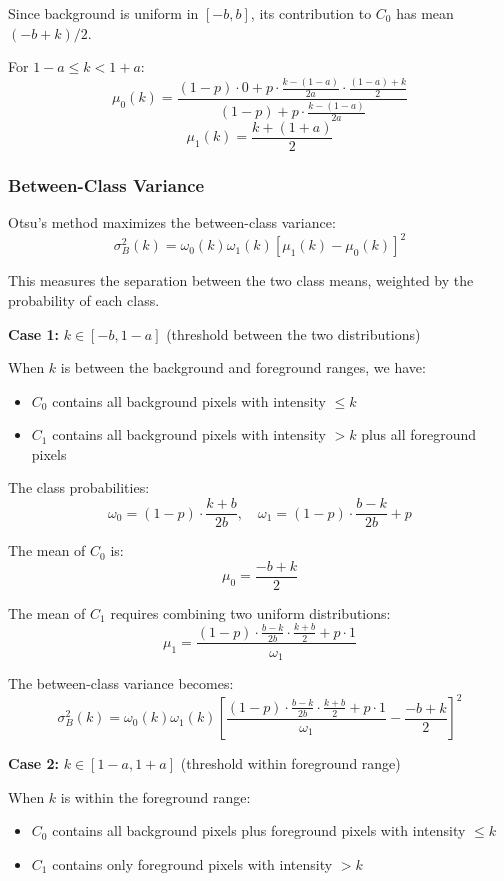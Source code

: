 \documentclass[11pt,a4paper]{article}
\begin{document}
Since background is uniform in $[-b, b]$, its contribution to $C_0$ has mean $(-b + k)/2$.

For $1-a \leq k < 1+a$:
$$\mu_0(k) = \frac{(1-p) \cdot 0 + p \cdot \frac{k-(1-a)}{2a} \cdot \frac{(1-a)+k}{2}}{(1-p) + p \cdot \frac{k-(1-a)}{2a}}$$
$$\mu_1(k) = \frac{k + (1+a)}{2}$$

\subsubsection{Between-Class Variance}
Otsu's method maximizes the between-class variance:
$$\sigma_B^2(k) = \omega_0(k) \omega_1(k) [\mu_1(k) - \mu_0(k)]^2$$

This measures the separation between the two class means, weighted by the probability of each class.

\textbf{Case 1: } $k \in [-b, 1-a]$ (threshold between the two distributions)

When $k$ is between the background and foreground ranges, we have:
\begin{itemize}
    \item $C_0$ contains all background pixels with intensity $\leq k$
    \item $C_1$ contains all background pixels with intensity $> k$ plus all foreground pixels
\end{itemize}

The class probabilities:
$$\omega_0 = (1-p) \cdot \frac{k+b}{2b}, \quad \omega_1 = (1-p) \cdot \frac{b-k}{2b} + p$$

The mean of $C_0$ is:
$$\mu_0 = \frac{-b + k}{2}$$

The mean of $C_1$ requires combining two uniform distributions:
$$\mu_1 = \frac{(1-p) \cdot \frac{b-k}{2b} \cdot \frac{k+b}{2} + p \cdot 1}{\omega_1}$$

The between-class variance becomes:
$$\sigma_B^2(k) = \omega_0(k) \omega_1(k) \left[\frac{(1-p) \cdot \frac{b-k}{2b} \cdot \frac{k+b}{2} + p \cdot 1}{\omega_1} - \frac{-b+k}{2}\right]^2$$

\textbf{Case 2: } $k \in [1-a, 1+a]$ (threshold within foreground range)

When $k$ is within the foreground range:
\begin{itemize}
    \item $C_0$ contains all background pixels plus foreground pixels with intensity $\leq k$
    \item $C_1$ contains only foreground pixels with intensity $> k$
\end{itemize}
\end{document}
